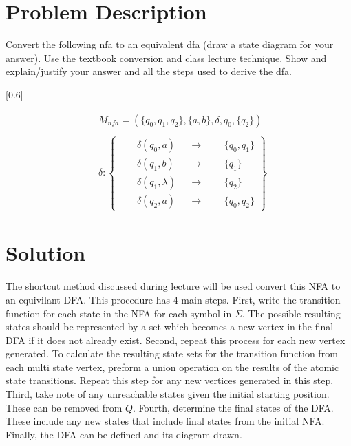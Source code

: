 \documentclass{assignment-x}
\begin{document}
\maketitle
\pagebreak

\section{Problem Description}
Convert the following nfa to an equivalent dfa (draw a state diagram for your answer). Use the textbook conversion and class lecture technique. Show and explain/justify your answer and all the steps used to derive the dfa.

[0.6\linewidth]

\begin{align*}
&M_{nfa} = (\{q_0,q_1,q_2\},\{a,b\},\delta,q_0,\{q_2\}) \\ \\
&\delta:
\left\{
\begin{aligned}
&\quad \delta(q_0,a) &&\rightarrow &&&\{q_0, q_1\} \\
&\quad \delta(q_1,b) &&\rightarrow &&&\{q_1\} \\
&\quad \delta(q_1,\lambda) &&\rightarrow &&&\{q_2\} \\
&\quad \delta(q_2,a) &&\rightarrow &&&\{q_0, q_2\}
\end{aligned}
\right\}
\end{align*}

\pagebreak

\section{Solution}
The shortcut method discussed during lecture will be used convert this NFA to an equivilant DFA. This procedure has 4 main steps. First, write the transition function for each state in the NFA for each symbol in $\Sigma$. The possible resulting states should be represented by a set which becomes a new vertex in the final DFA if it does not already exist. Second, repeat this process for each new vertex generated. To calculate the resulting state sets for the transition function from each multi state vertex, preform a union operation on the results of the atomic state transitions. Repeat this step for any new vertices generated in this step. Third, take note of any unreachable states given the initial starting position. These can be removed from $Q$. Fourth, determine the final states of the DFA. These include any new states that include final states from the initial NFA. Finally, the DFA can be defined and its diagram drawn.
\end{document}
